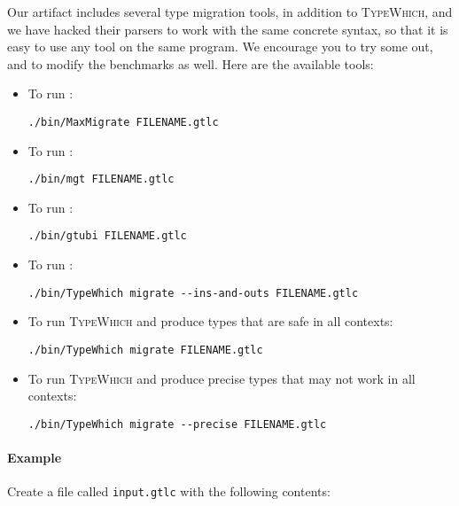 \documentclass{book}
\newcommand{\system}{\textsc{TypeWhich}\xspace}
\begin{document}
Our artifact includes several type migration tools, in addition to \system, and
we have hacked their parsers to work with the same concrete syntax, so that it
is easy to use any tool on the same program. We encourage you to try some out,
and to modify the benchmarks as well. Here are the available tools:

\begin{itemize}

\item To run \citet{migeed:decidable}:
     
\begin{verbatim}
./bin/MaxMigrate FILENAME.gtlc
\end{verbatim}

\item To run \citet{campora:migrating}:

\begin{verbatim}
./bin/mgt FILENAME.gtlc
\end{verbatim}

\item To run \citet{siek:gti}:

\begin{verbatim}
./bin/gtubi FILENAME.gtlc
\end{verbatim}

\item To run \citet{rastogi:gti}:
\begin{verbatim}
./bin/TypeWhich migrate --ins-and-outs FILENAME.gtlc
\end{verbatim}

\item To run \system{} and produce types that are safe in all contexts:
\begin{verbatim}
./bin/TypeWhich migrate FILENAME.gtlc
\end{verbatim}

\item To run \system{} and produce precise types that may not work in all
contexts:
\begin{verbatim}
./bin/TypeWhich migrate --precise FILENAME.gtlc
\end{verbatim}

\end{itemize}

\paragraph{Example}
Create a file called \texttt{input.gtlc} with the following contents:
\end{document}
